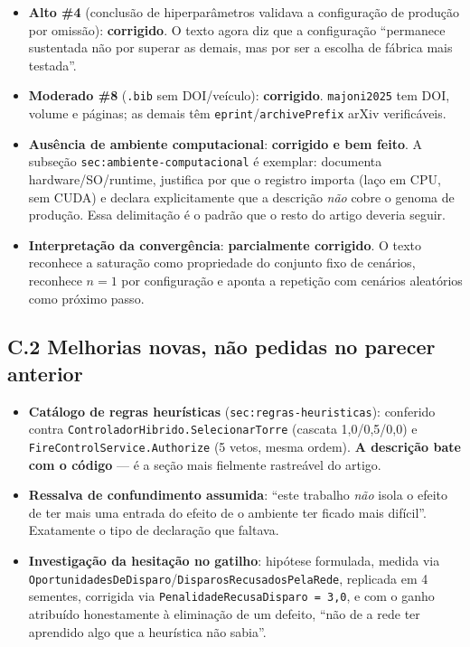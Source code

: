\documentclass[11pt,a4paper]{article}
\begin{document}
\begin{itemize}
  \item \textbf{Alto \#4} (conclusão de hiperparâmetros validava a configuração de produção por
  omissão): \textbf{corrigido}. O texto agora diz que a configuração ``permanece sustentada não por
  superar as demais, mas por ser a escolha de fábrica mais testada''.
  \item \textbf{Moderado \#8} (\texttt{.bib} sem DOI/veículo): \textbf{corrigido}.
  \texttt{majoni2025} tem DOI, volume e páginas; as demais têm \texttt{eprint}/\texttt{archivePrefix}
  arXiv verificáveis.
  \item \textbf{Ausência de ambiente computacional}: \textbf{corrigido e bem feito}. A subseção
  \texttt{sec:ambiente-computacional} é exemplar: documenta hardware/SO/runtime, justifica por que o
  registro importa (laço em CPU, sem CUDA) e declara explicitamente que a descrição \emph{não} cobre
  o genoma de produção. Essa delimitação é o padrão que o resto do artigo deveria seguir.
  \item \textbf{Interpretação da convergência}: \textbf{parcialmente corrigido}. O texto reconhece a
  saturação como propriedade do conjunto fixo de cenários, reconhece $n=1$ por configuração e aponta
  a repetição com cenários aleatórios como próximo passo.
\end{itemize}

\subsection*{C.2 Melhorias novas, não pedidas no parecer anterior}

\begin{itemize}
  \item \textbf{Catálogo de regras heurísticas} (\texttt{sec:regras-heuristicas}): conferido contra
  \texttt{ControladorHibrido.SelecionarTorre} (cascata 1,0/0,5/0,0) e
  \texttt{FireControlService.Authorize} (5 vetos, mesma ordem). \textbf{A descrição bate com o
  código} --- é a seção mais fielmente rastreável do artigo.
  \item \textbf{Ressalva de confundimento assumida}: ``este trabalho \emph{não} isola o efeito de ter
  mais uma entrada do efeito de o ambiente ter ficado mais difícil''. Exatamente o tipo de declaração
  que faltava.
  \item \textbf{Investigação da hesitação no gatilho}: hipótese formulada, medida via
  \texttt{OportunidadesDeDisparo}/\texttt{DisparosRecusadosPelaRede}, replicada em 4 sementes,
  corrigida via \texttt{PenalidadeRecusaDisparo = 3,0}, e com o ganho atribuído honestamente à
  eliminação de um defeito, ``não de a rede ter aprendido algo que a heurística não sabia''.
\end{itemize}
\end{document}
